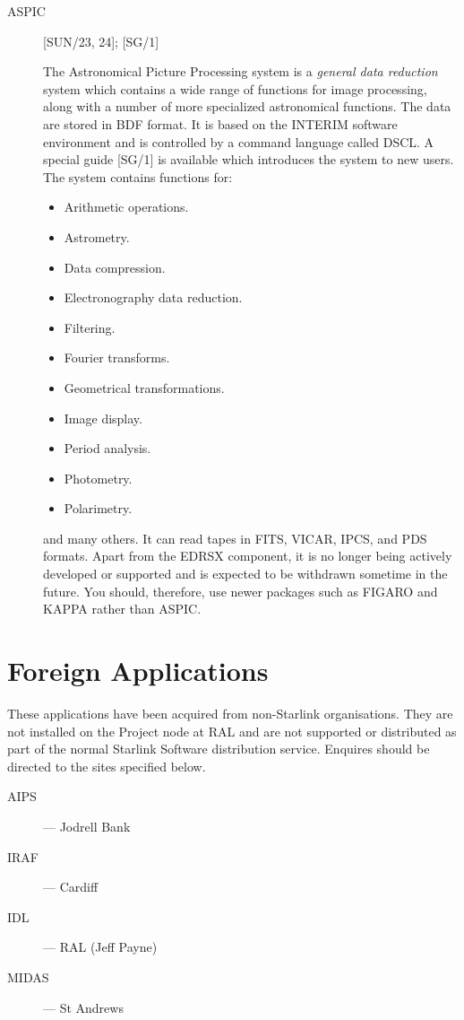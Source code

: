 \begin{description}

\item [ASPIC] \hfill [SUN/23, 24]; [SG/1]

The Astronomical Picture Processing system is a {\em general data reduction}
system which contains a wide range of functions for image processing, along
with a number of more specialized astronomical functions.
The data are stored in BDF format.
It is based on the INTERIM software environment and is controlled by a command
language called DSCL.
A special guide [SG/1] is available which introduces the system to new users.
The system contains functions for:
\begin{itemize}
\item Arithmetic operations.
\item Astrometry.
\item Data compression.
\item Electronography data reduction.
\item Filtering.
\item Fourier transforms.
\item Geometrical transformations.
\item Image display.
\item Period analysis.
\item Photometry.
\item Polarimetry.
\end{itemize}
and many others.
It can read tapes in FITS, VICAR, IPCS, and PDS formats.
Apart from the EDRSX component, it is no longer being actively developed
or supported and is expected to be withdrawn sometime in the future.
You should, therefore, use newer packages such as FIGARO and KAPPA rather than
ASPIC.

\end{description}

\newpage

\section{Foreign Applications}

These applications have been acquired from non-Starlink organisations.
They are not installed on the Project node at RAL and are not supported or
distributed as part of the normal Starlink Software distribution service.
Enquires should be directed to the sites specified below.
\begin{description}
\begin{description}
\item [AIPS] --- Jodrell Bank
\item [IRAF] --- Cardiff
\item [IDL] --- RAL (Jeff Payne)
\item [MIDAS] --- St Andrews
\end{description}
\end{description}


